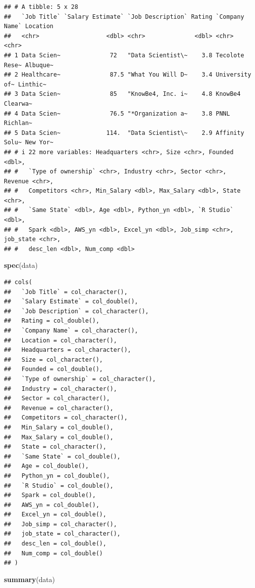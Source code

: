 \documentclass[
]{article}
\newenvironment{Shaded}{\begin{snugshade}}{\end{snugshade}}
\newcommand{\FunctionTok}[1]{\textcolor[rgb]{0.13,0.29,0.53}{\textbf{#1}}}
\newcommand{\NormalTok}[1]{#1}
\begin{document}
\begin{verbatim}
## # A tibble: 5 x 28
##   `Job Title` `Salary Estimate` `Job Description` Rating `Company Name` Location
##   <chr>                   <dbl> <chr>              <dbl> <chr>          <chr>   
## 1 Data Scien~              72   "Data Scientist\~    3.8 Tecolote Rese~ Albuque~
## 2 Healthcare~              87.5 "What You Will D~    3.4 University of~ Linthic~
## 3 Data Scien~              85   "KnowBe4, Inc. i~    4.8 KnowBe4        Clearwa~
## 4 Data Scien~              76.5 "*Organization a~    3.8 PNNL           Richlan~
## 5 Data Scien~             114.  "Data Scientist\~    2.9 Affinity Solu~ New Yor~
## # i 22 more variables: Headquarters <chr>, Size <chr>, Founded <dbl>,
## #   `Type of ownership` <chr>, Industry <chr>, Sector <chr>, Revenue <chr>,
## #   Competitors <chr>, Min_Salary <dbl>, Max_Salary <dbl>, State <chr>,
## #   `Same State` <dbl>, Age <dbl>, Python_yn <dbl>, `R Studio` <dbl>,
## #   Spark <dbl>, AWS_yn <dbl>, Excel_yn <dbl>, Job_simp <chr>, job_state <chr>,
## #   desc_len <dbl>, Num_comp <dbl>
\end{verbatim}

\begin{Shaded}
\begin{Highlighting}[]
\FunctionTok{spec}\NormalTok{(data)}
\end{Highlighting}
\end{Shaded}

\begin{verbatim}
## cols(
##   `Job Title` = col_character(),
##   `Salary Estimate` = col_double(),
##   `Job Description` = col_character(),
##   Rating = col_double(),
##   `Company Name` = col_character(),
##   Location = col_character(),
##   Headquarters = col_character(),
##   Size = col_character(),
##   Founded = col_double(),
##   `Type of ownership` = col_character(),
##   Industry = col_character(),
##   Sector = col_character(),
##   Revenue = col_character(),
##   Competitors = col_character(),
##   Min_Salary = col_double(),
##   Max_Salary = col_double(),
##   State = col_character(),
##   `Same State` = col_double(),
##   Age = col_double(),
##   Python_yn = col_double(),
##   `R Studio` = col_double(),
##   Spark = col_double(),
##   AWS_yn = col_double(),
##   Excel_yn = col_double(),
##   Job_simp = col_character(),
##   job_state = col_character(),
##   desc_len = col_double(),
##   Num_comp = col_double()
## )
\end{verbatim}

\begin{Shaded}
\begin{Highlighting}[]
\FunctionTok{summary}\NormalTok{(data)}
\end{Highlighting}
\end{Shaded}
\end{document}
